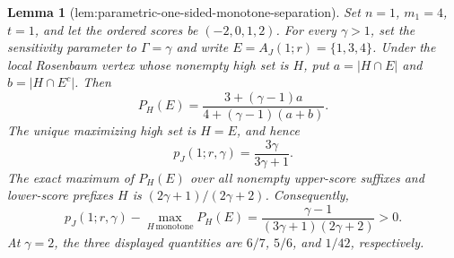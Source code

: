 \documentclass{article}
\newtheorem{lemma}{Lemma}
\begin{document}
\begin{lemma}[lem:parametric-one-sided-monotone-separation]\label{lem:parametric-one-sided-monotone-separation}
Set \(n=1\), \(m_1=4\), \(t=1\), and let the ordered scores be \((-2,0,1,2)\). For every \(\gamma>1\), set the sensitivity parameter to \(\Gamma=\gamma\) and write \(E=A_J(1;r)=\{1,3,4\}\). Under the local Rosenbaum vertex whose nonempty high set is \(H\), put \(a=\lvert H\cap E\rvert\) and \(b=\lvert H\cap E^c\rvert\). Then \[ P_H(E)=\frac{3+(\gamma-1)a}{4+(\gamma-1)(a+b)}. \] The unique maximizing high set is \(H=E\), and hence \[ p_J(1;r,\gamma)=\frac{3\gamma}{3\gamma+1}. \] The exact maximum of \(P_H(E)\) over all nonempty upper-score suffixes and lower-score prefixes \(H\) is \( (2\gamma+1)/(2\gamma+2)\). Consequently, \[ p_J(1;r,\gamma)-\max_{H\,\mathrm{monotone}}P_H(E)=\frac{\gamma-1}{(3\gamma+1)(2\gamma+2)}>0. \] At \(\gamma=2\), the three displayed quantities are \(6/7\), \(5/6\), and \(1/42\), respectively.
\end{lemma}
\end{document}

